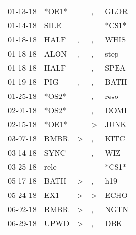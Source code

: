 \begin{supertabular}{p{0.07\textwidth}p{0.06\textwidth}p{0.02\textwidth}p{0.02\textwidth}p{0.06\textwidth}}
 01-13-18\textsuperscript{} &                   *OE1* &               &                , &  GLOR\textsuperscript{} \\
 01-14-18\textsuperscript{} &  SILE\textsuperscript{} &               &                  &                   *CS1* \\
 01-18-18\textsuperscript{} &  HALF\textsuperscript{} &             , &                , &  WHIS\textsuperscript{} \\
 01-18-18\textsuperscript{} &  ALON\textsuperscript{} &             , &                , &  step\textsuperscript{} \\
 01-18-18\textsuperscript{} &  HALF\textsuperscript{} &               &                , &  SPEA\textsuperscript{} \\
 01-19-18\textsuperscript{} &   PIG\textsuperscript{} &             , &                , &  BATH\textsuperscript{} \\
 01-25-18\textsuperscript{} &                   *OS2* &               &                , &  reso\textsuperscript{} \\
 02-01-18\textsuperscript{} &                   *OS2* &               &                , &  DOMI\textsuperscript{} \\
 02-15-18\textsuperscript{} &                   *OE1* &               &     \textgreater &  JUNK\textsuperscript{} \\
 03-07-18\textsuperscript{} &  RMBR\textsuperscript{} &  \textgreater &                , &  KITC\textsuperscript{} \\
 03-14-18\textsuperscript{} &  SYNC\textsuperscript{} &               &                , &   WIZ\textsuperscript{} \\
 03-25-18\textsuperscript{} &  rele\textsuperscript{} &               &                  &                   *CS1* \\
 05-17-18\textsuperscript{} &  BATH\textsuperscript{} &  \textgreater &                , &   h19\textsuperscript{} \\
 05-24-18\textsuperscript{} &   EX1\textsuperscript{} &  \textgreater &     \textgreater &  ECHO\textsuperscript{} \\
 06-02-18\textsuperscript{} &  RMBR\textsuperscript{} &  \textgreater &                , &  NGTN\textsuperscript{} \\
 06-29-18\textsuperscript{} &  UPWD\textsuperscript{} &  \textgreater &                , &   DBK\textsuperscript{} \\

\end{supertabular}
